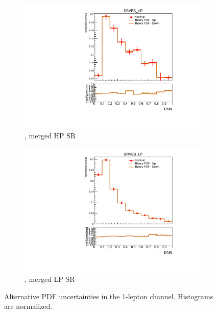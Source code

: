 \begin{figure}[ht]
\begin{subfigure}[b]{0.3\textwidth}
        \includegraphics[width=\textwidth]{figures/1lep/PDFUnc/TheoryPDF/Z_0ptag1pfat0pjet_0ptv_SRVBS_HP_DNN_SysTheoryPDF_Z__1up_Norm.pdf}
        \caption{\Zjets, merged HP SR}
    \end{subfigure}
    \begin{subfigure}[b]{0.3\textwidth}
        \includegraphics[width=\textwidth]{figures/1lep/PDFUnc/TheoryPDF/Z_0ptag1pfat0pjet_0ptv_SRVBS_LP_DNN_SysTheoryPDF_Z__1up_Norm.pdf}
        \caption{\Zjets, merged LP SR}
    \end{subfigure}
    \caption{Alternative PDF uncertainties in the 1-lepton channel. Histograms are normalized.}
    \label{fig:extPDFUnc1Lep}
\end{figure}


